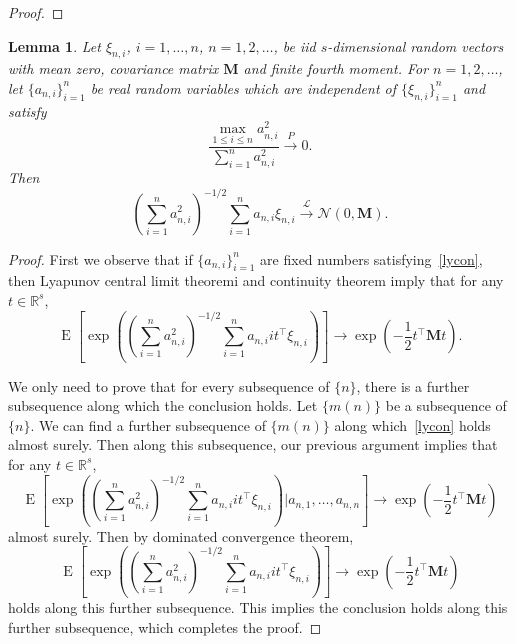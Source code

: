 \documentclass[12pt]{article} %
\DeclareMathOperator{\myE}{E}
\newcommand{\bM}{\mathbf{M}}
\newtheorem{lemma}{Lemma}
\theoremstyle{definition}
\begin{document}
\begin{appendices}
\begin{proof}
\end{proof}

\begin{lemma}
    Let $\xi_{n,i}$, $i=1,\ldots, n$, $n=1,2,\ldots$, be iid $s$-dimensional random vectors with mean zero, covariance matrix $\bM$ and finite fourth moment.
    For $n=1,2,\ldots$, let $\{a_{n,i}\}_{i=1}^n$ be real random variables which are independent of $\{\xi_{n,i}\}_{i=1}^n$ and satisfy 
    \begin{equation}\label{lycon}
        \frac{\max_{1\leq i\leq n}a_{n,i}^2}{\sum_{i=1}^n a_{n,i}^2}\xrightarrow{P}0.
    \end{equation}
    Then
    \begin{equation*}
    (\sum_{i=1}^n a_{n,i}^2)^{-1/2}\sum_{i=1}^n a_{n,i}\xi_{n,i} 
    \xrightarrow{\mathcal{L}}\mathcal{N}(0,\bM).
    \end{equation*}
    \label{CLTLEMMA}
\end{lemma}
\begin{proof}
    First we observe that if $\{a_{n,i}\}_{i=1}^n$ are fixed numbers satisfying~\eqref{lycon}, then Lyapunov central limit theoremi and continuity theorem imply that 
    for any $t\in\mathbb{R}^s$,
    \begin{equation*}
        \myE\left[\exp\left(
    (\sum_{i=1}^n a_{n,i}^2)^{-1/2}\sum_{i=1}^n a_{n,i}it^\top \xi_{n,i} 
    \right)\right]
    \to
    \exp\left(-\frac{1}{2} t^\top \bM t\right).
    \end{equation*}

    We only need to prove that for every subsequence of $\{n\}$, there is a further subsequence along which the conclusion holds.
    Let $\{m(n)\}$  be a subsequence of $\{n\}$.
    We can find a further subsequence of $\{m(n)\}$ along which~\eqref{lycon} holds almost surely.
    Then along this subsequence, our previous argument implies that
    for any $t\in\mathbb{R}^s$,
    \begin{equation*}
        \myE
       \left[ 
        \exp\left(
    (\sum_{i=1}^n a_{n,i}^2)^{-1/2}\sum_{i=1}^n a_{n,i}it^\top \xi_{n,i} 
    \right)
    \bigg| a_{n,1},\ldots, a_{n,n}
\right]
    \to
    \exp\left(-\frac{1}{2} t^\top \bM t\right)
    \end{equation*}
    almost surely.
    Then by dominated convergence theorem,
    \begin{equation*}
        \myE
       \left[ 
        \exp\left(
    (\sum_{i=1}^n a_{n,i}^2)^{-1/2}\sum_{i=1}^n a_{n,i}it^\top \xi_{n,i} 
    \right)
\right]
    \to
    \exp\left(-\frac{1}{2} t^\top \bM t\right)
    \end{equation*}
    holds along this further subsequence. This implies the conclusion holds along this further subsequence, which completes the proof.





\end{proof}
\end{appendices}
\end{document}
